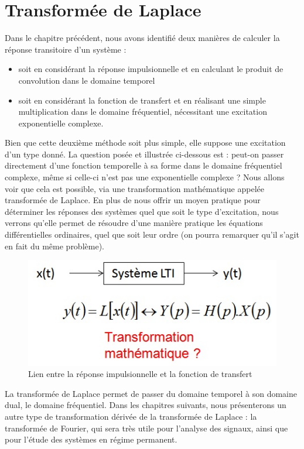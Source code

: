 \chapter{Transformée de Laplace}	
\label{chap:laplace}	
	Dans le chapitre précédent, nous avons identifié deux manières de calculer la réponse transitoire d'un système :
	\begin{itemize}
		\item soit en considérant la réponse impulsionnelle et en calculant le produit de convolution dans le domaine temporel
		\item soit en considérant la fonction de transfert et en réalisant une simple multiplication dans le domaine fréquentiel, nécessitant une excitation exponentielle complexe.\\
	\end{itemize}

	Bien que cette deuxième méthode soit plus simple, elle suppose une excitation d'un type donné. La question posée et illustrée ci-dessous est : peut-on passer directement d'une fonction temporelle à sa forme dans le domaine fréquentiel complexe, même si celle-ci n'est pas une exponentielle complexe ? Nous allons voir que cela est possible, via une transformation mathématique appelée transformée de Laplace. En plus de nous offrir un moyen pratique pour déterminer les réponses des systèmes quel que soit le type d'excitation, nous verrons  qu'elle permet de résoudre d'une manière pratique les équations différentielles ordinaires, quel que soit leur ordre (on pourra remarquer qu'il s'agit en fait du même problème). 
	
	\begin{figure}[h!]
		\centering
		\includegraphics[scale=0.5]{images/Position_Pb_Laplace.jpg}
		\caption{Lien entre la réponse impulsionnelle et la fonction de transfert}	
		\label{Fig:Position_Pb_Laplace} 
	\end{figure}
	
	 La transformée de Laplace permet de passer du domaine temporel à son domaine dual, le domaine fréquentiel. Dans les chapitres suivants, nous présenterons un autre type de transformation dérivée de la transformée de Laplace : la transformée de Fourier, qui sera très utile pour l'analyse des signaux, ainsi que pour l'étude des systèmes en régime permanent.
	
